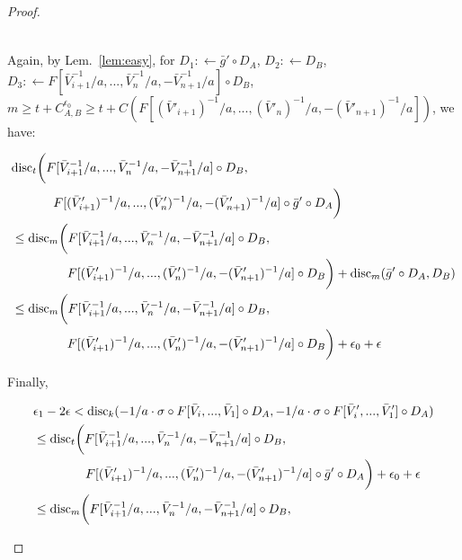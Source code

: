 \documentclass{article} %
\newcommand{\disc}{\textnormal{disc}}
\begin{document}
\begin{proof}
\begin{small}
\begin{equation}
\begin{aligned}
\end{aligned}
\end{equation}
\end{small}
Again, by Lem.~\ref{lem:easy}, for $D_1 :\leftarrow \bar{g}' \circ D_A$, $D_2 :\leftarrow D_B$, $D_3 :\leftarrow F[\bar{V}^{-1}_{i+1}/a,...,\bar{V}^{-1}_n/a,-\bar{V}^{-1}_{n+1}/a] \circ D_B$, $m \geq  t + C^{\epsilon_0}_{A,B} \geq t + C(F[(\bar{V}'_{i+1})^{-1}/a,...,(\bar{V}'_n)^{-1}/a,-(\bar{V}'_{n+1})^{-1}/a])$, we have: 
\begin{small}
\begin{equation}
\begin{aligned}
&\disc_{t}\bigg(F[\bar{V}^{-1}_{i+1}/a,...,\bar{V}^{-1}_n/a,-\bar{V}^{-1}_{n+1}/a] \circ D_B, \\
&\;\;\;\;\;\;\;\;\;\;\;\; F[(\bar{V}'_{i+1})^{-1}/a,...,(\bar{V}'_n)^{-1}/a,-(\bar{V}'_{n+1})^{-1}/a] \circ \bar{g}' \circ D_A\bigg)  \\
&\leq \disc_{m}\bigg(F[\bar{V}^{-1}_{i+1}/a,...,\bar{V}^{-1}_n/a,-\bar{V}^{-1}_{n+1}/a] \circ D_B, \\
&\;\;\;\;\;\;\;\;\;\;\;\;\;\;\;\; F[(\bar{V}'_{i+1})^{-1}/a,...,(\bar{V}'_n)^{-1}/a,-(\bar{V}'_{n+1})^{-1}/a] \circ D_B\bigg) + \disc_{m}(\bar{g}' \circ D_A, D_B) \\
&\leq \disc_{m}\bigg( F[\bar{V}^{-1}_{i+1}/a,...,\bar{V}^{-1}_n/a,-\bar{V}^{-1}_{n+1}/a] \circ D_B, \\
&\;\;\;\;\;\;\;\;\;\;\;\;\;\;\;\; F[(\bar{V}'_{i+1})^{-1}/a,...,(\bar{V}'_n)^{-1}/a,-(\bar{V}'_{n+1})^{-1}/a] \circ D_B \bigg) +\epsilon_0 + \epsilon
\end{aligned}
\end{equation}
\end{small}
Finally, 
\begin{small}
\begin{equation}
\begin{aligned}
&\epsilon_1 - 2\epsilon < \disc_{k}(-1/a \cdot \sigma \circ F[\bar{V}_i,...,\bar{V}_1] \circ D_A, -1/a \cdot \sigma \circ F[\bar{V}'_i,...,\bar{V}'_1] \circ D_A) \\
&\leq \disc_{t}\bigg(F[\bar{V}^{-1}_{i+1}/a,...,\bar{V}^{-1}_n/a,-\bar{V}^{-1}_{n+1}/a] \circ D_B,\\
&\;\;\;\;\;\;\;\;\;\;\;\;\;\;\; F[(\bar{V}'_{i+1})^{-1}/a,...,(\bar{V}'_n)^{-1}/a,-(\bar{V}'_{n+1})^{-1}/a] \circ \bar{g}' \circ D_A\bigg) + \epsilon_0+\epsilon \\
&\leq \disc_{m}\bigg(F[\bar{V}^{-1}_{i+1}/a,...,\bar{V}^{-1}_n/a,-\bar{V}^{-1}_{n+1}/a] \circ D_B, \\

\end{aligned}
\end{equation}
\end{small}
\end{proof}
\end{document}
